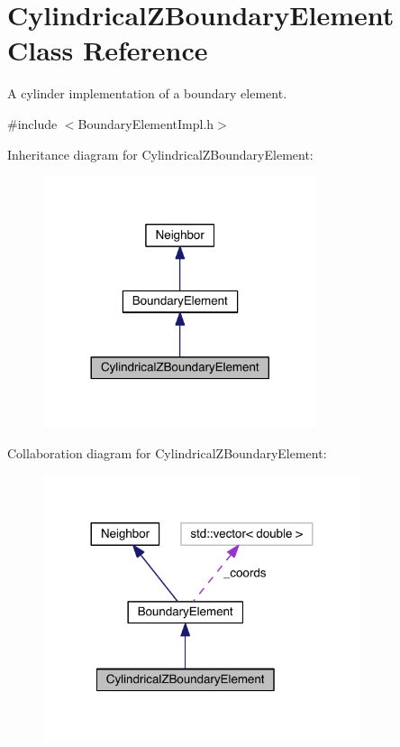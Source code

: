 \hypertarget{classCylindricalZBoundaryElement}{\section{Cylindrical\+Z\+Boundary\+Element Class Reference}
\label{classCylindricalZBoundaryElement}
}


A cylinder implementation of a boundary element.  




{\ttfamily \#include $<$Boundary\+Element\+Impl.\+h$>$}



Inheritance diagram for Cylindrical\+Z\+Boundary\+Element\+:\nopagebreak
\begin{figure}[H]
\begin{center}
\leavevmode
\includegraphics[width=228pt]{classCylindricalZBoundaryElement__inherit__graph}
\end{center}
\end{figure}


Collaboration diagram for Cylindrical\+Z\+Boundary\+Element\+:\nopagebreak
\begin{figure}[H]
\begin{center}
\leavevmode
\includegraphics[width=264pt]{classCylindricalZBoundaryElement__coll__graph}
\end{center}
\end{figure}
